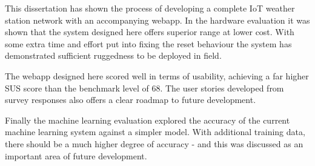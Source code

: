 This dissertation has shown the process of developing a complete IoT weather
station network with an accompanying webapp. In the hardware evaluation it was
shown that the system designed here offers superior range at lower cost. With
some extra time and effort put into fixing the reset behaviour the system has
demonstrated sufficient ruggedness to be deployed in field. 

The webapp designed here scored well in terms of usability, achieving a far
higher SUS score than the benchmark level of 68. The user stories developed from
survey responses also offers a clear roadmap to future development.

Finally the machine learning evaluation explored the accuracy of the current
machine learning system against a simpler model. With additional training data,
there should be a much higher degree of accuracy - and this was discussed as an
important area of future development. 